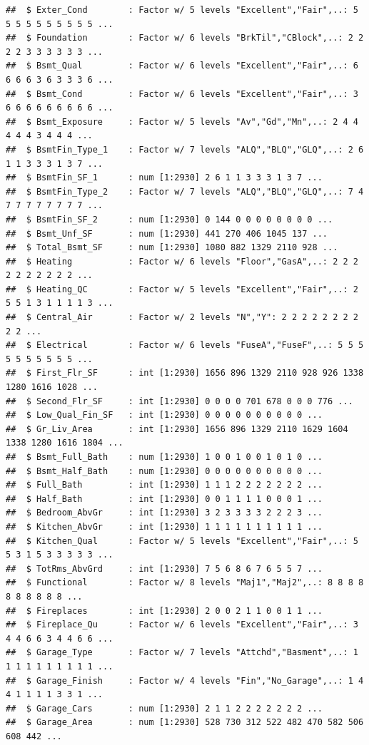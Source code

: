 \documentclass[
]{book}
\theoremstyle{definition}
\theoremstyle{definition}
\theoremstyle{definition}
\theoremstyle{definition}
\theoremstyle{remark}
\begin{document}
\begin{verbatim}
##  $ Exter_Cond        : Factor w/ 5 levels "Excellent","Fair",..: 5 5 5 5 5 5 5 5 5 5 ...
##  $ Foundation        : Factor w/ 6 levels "BrkTil","CBlock",..: 2 2 2 2 3 3 3 3 3 3 ...
##  $ Bsmt_Qual         : Factor w/ 6 levels "Excellent","Fair",..: 6 6 6 6 3 6 3 3 3 6 ...
##  $ Bsmt_Cond         : Factor w/ 6 levels "Excellent","Fair",..: 3 6 6 6 6 6 6 6 6 6 ...
##  $ Bsmt_Exposure     : Factor w/ 5 levels "Av","Gd","Mn",..: 2 4 4 4 4 4 3 4 4 4 ...
##  $ BsmtFin_Type_1    : Factor w/ 7 levels "ALQ","BLQ","GLQ",..: 2 6 1 1 3 3 3 1 3 7 ...
##  $ BsmtFin_SF_1      : num [1:2930] 2 6 1 1 3 3 3 1 3 7 ...
##  $ BsmtFin_Type_2    : Factor w/ 7 levels "ALQ","BLQ","GLQ",..: 7 4 7 7 7 7 7 7 7 7 ...
##  $ BsmtFin_SF_2      : num [1:2930] 0 144 0 0 0 0 0 0 0 0 ...
##  $ Bsmt_Unf_SF       : num [1:2930] 441 270 406 1045 137 ...
##  $ Total_Bsmt_SF     : num [1:2930] 1080 882 1329 2110 928 ...
##  $ Heating           : Factor w/ 6 levels "Floor","GasA",..: 2 2 2 2 2 2 2 2 2 2 ...
##  $ Heating_QC        : Factor w/ 5 levels "Excellent","Fair",..: 2 5 5 1 3 1 1 1 1 3 ...
##  $ Central_Air       : Factor w/ 2 levels "N","Y": 2 2 2 2 2 2 2 2 2 2 ...
##  $ Electrical        : Factor w/ 6 levels "FuseA","FuseF",..: 5 5 5 5 5 5 5 5 5 5 ...
##  $ First_Flr_SF      : int [1:2930] 1656 896 1329 2110 928 926 1338 1280 1616 1028 ...
##  $ Second_Flr_SF     : int [1:2930] 0 0 0 0 701 678 0 0 0 776 ...
##  $ Low_Qual_Fin_SF   : int [1:2930] 0 0 0 0 0 0 0 0 0 0 ...
##  $ Gr_Liv_Area       : int [1:2930] 1656 896 1329 2110 1629 1604 1338 1280 1616 1804 ...
##  $ Bsmt_Full_Bath    : num [1:2930] 1 0 0 1 0 0 1 0 1 0 ...
##  $ Bsmt_Half_Bath    : num [1:2930] 0 0 0 0 0 0 0 0 0 0 ...
##  $ Full_Bath         : int [1:2930] 1 1 1 2 2 2 2 2 2 2 ...
##  $ Half_Bath         : int [1:2930] 0 0 1 1 1 1 0 0 0 1 ...
##  $ Bedroom_AbvGr     : int [1:2930] 3 2 3 3 3 3 2 2 2 3 ...
##  $ Kitchen_AbvGr     : int [1:2930] 1 1 1 1 1 1 1 1 1 1 ...
##  $ Kitchen_Qual      : Factor w/ 5 levels "Excellent","Fair",..: 5 5 3 1 5 3 3 3 3 3 ...
##  $ TotRms_AbvGrd     : int [1:2930] 7 5 6 8 6 7 6 5 5 7 ...
##  $ Functional        : Factor w/ 8 levels "Maj1","Maj2",..: 8 8 8 8 8 8 8 8 8 8 ...
##  $ Fireplaces        : int [1:2930] 2 0 0 2 1 1 0 0 1 1 ...
##  $ Fireplace_Qu      : Factor w/ 6 levels "Excellent","Fair",..: 3 4 4 6 6 3 4 4 6 6 ...
##  $ Garage_Type       : Factor w/ 7 levels "Attchd","Basment",..: 1 1 1 1 1 1 1 1 1 1 ...
##  $ Garage_Finish     : Factor w/ 4 levels "Fin","No_Garage",..: 1 4 4 1 1 1 1 3 3 1 ...
##  $ Garage_Cars       : num [1:2930] 2 1 1 2 2 2 2 2 2 2 ...
##  $ Garage_Area       : num [1:2930] 528 730 312 522 482 470 582 506 608 442 ...

\end{verbatim}
\end{document}
